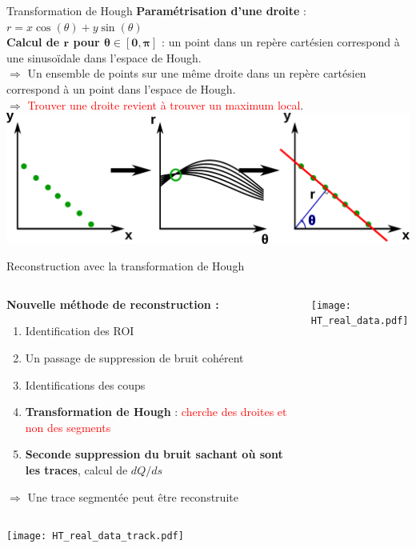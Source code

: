     \begin{frame}{Transformation de Hough}
        \textbf{Paramétrisation d'une droite }: $r=x\cos(\theta)+y\sin(\theta)$\\
        \textbf{Calcul de $\boldsymbol{r}$ pour $\boldsymbol{\theta\in[0,\pi]}$} : un point dans un repère cartésien correspond à une sinusoïdale dans l'espace de Hough.\\
        $\Rightarrow$ Un ensemble de points sur une même droite dans un repère cartésien correspond à un point dans l'espace de Hough.\\
        $\Rightarrow$ \textcolor{red}{Trouver une droite revient à trouver un maximum local}.\\\vfill
        \includegraphics[width=\textwidth]{./pictures/HT.pdf}
    \end{frame}

    \begin{frame}{Reconstruction avec la transformation de Hough}
        \begin{scriptsize}
            \begin{columns}
                \begin{column}{0.5\textwidth}
                    \textbf{Nouvelle méthode de reconstruction :}
                    \begin{enumerate}
                        \item Identification des ROI
                        \item Un passage de suppression de bruit cohérent
                        \item Identifications des coups
                        \item \textbf{Transformation de Hough} : \textcolor{red}{cherche des droites et non des segments}
                        \item \textbf{Seconde suppression du bruit sachant où sont les traces}, calcul de $dQ/ds$
                    \end{enumerate}
                    $\Rightarrow$ Une trace segmentée peut être reconstruite
                \end{column}
                \begin{column}{0.5\textwidth}
                    \centering \texttt{[image: HT\_real\_data.pdf]}
                \end{column}
            \end{columns}
            \begin{center} \texttt{[image: HT\_real\_data\_track.pdf]} \end{center}
        \end{scriptsize}
    \end{frame}

